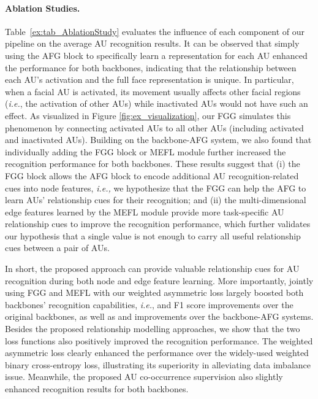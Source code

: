 \documentclass{article}
\begin{document}
\paragraph{Ablation Studies.} Table~\ref{ex:tab_AblationStudy} evaluates the influence of each component of our pipeline on the average AU recognition results. It can be observed that simply using the AFG block to specifically learn a representation for each AU enhanced the performance for both backbones, indicating that the relationship between each AU's activation and the full face representation is unique. In particular, when a facial AU is activated, its movement usually affects other facial regions (\emph{i.e.}, the activation of other AUs) while inactivated AUs would not have such an effect. As visualized in Figure \ref{fig:ex_visualization}, our FGG simulates this phenomenon by connecting activated AUs to all other AUs (including activated and inactivated AUs). Building on the backbone-AFG system, we also found that individually adding the FGG block or MEFL module further increased the recognition performance for both backbones. These results suggest that (i) the FGG block allows the AFG block to encode additional AU recognition-related cues into node features, \emph{i.e.,} we hypothesize that the FGG can help the AFG to learn AUs' relationship cues for their recognition; and (ii) the multi-dimensional edge features learned by the MEFL module provide more task-specific AU relationship cues to improve the recognition performance, which further validates our hypothesis that a single value is not enough to carry all useful relationship cues between a pair of AUs.






In short, the proposed approach can provide valuable relationship cues for AU recognition during both node and edge feature learning. More importantly, jointly using FGG and MEFL with our weighted asymmetric loss largely boosted both backbones' recognition capabilities, \emph{i.e.},  and  F1 score improvements over the original backbones, as well as  and  improvements over the backbone-AFG systems. Besides the proposed relationship modelling approaches, we show that the two loss functions also positively improved the recognition performance. The weighted asymmetric loss clearly enhanced the performance over the widely-used weighted binary cross-entropy loss, illustrating its superiority in alleviating data imbalance issue. Meanwhile, the proposed AU co-occurrence supervision also slightly enhanced recognition results for both backbones.
\end{document}
